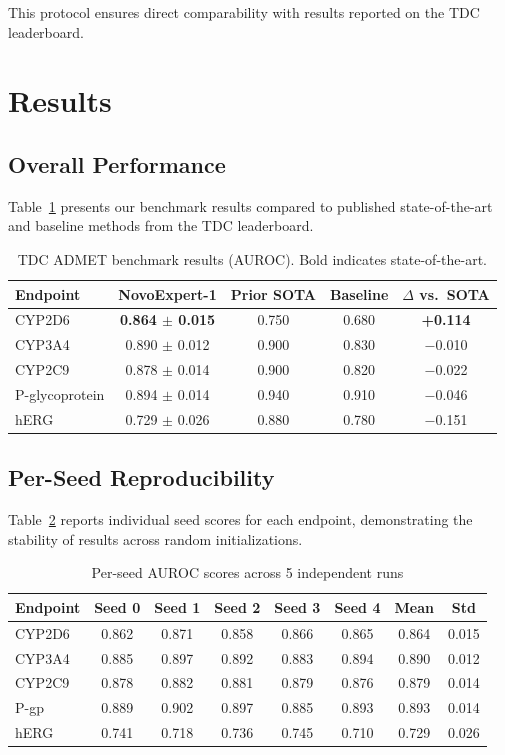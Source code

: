 \documentclass[11pt]{article}
\begin{document}
This protocol ensures direct comparability with results reported on the TDC leaderboard.

\section{Results}

\subsection{Overall Performance}

Table~\ref{tab:results} presents our benchmark results compared to published state-of-the-art and baseline methods from the TDC leaderboard.

\begin{table}[h]
\centering
\caption{TDC ADMET benchmark results (AUROC). Bold indicates state-of-the-art.}
\label{tab:results}
\begin{tabular}{lcccc}
\toprule
Endpoint & NovoExpert-1 & Prior SOTA & Baseline & $\Delta$ vs.\ SOTA \\
\midrule
CYP2D6 & \textbf{0.864 $\pm$ 0.015} & 0.750 & 0.680 & \textbf{+0.114} \\
CYP3A4 & 0.890 $\pm$ 0.012 & 0.900 & 0.830 & $-$0.010 \\
CYP2C9 & 0.878 $\pm$ 0.014 & 0.900 & 0.820 & $-$0.022 \\
P-glycoprotein & 0.894 $\pm$ 0.014 & 0.940 & 0.910 & $-$0.046 \\
hERG & 0.729 $\pm$ 0.026 & 0.880 & 0.780 & $-$0.151 \\
\bottomrule
\end{tabular}
\end{table}

\subsection{Per-Seed Reproducibility}

Table~\ref{tab:persseed} reports individual seed scores for each endpoint, demonstrating the stability of results across random initializations.

\begin{table}[h]
\centering
\caption{Per-seed AUROC scores across 5 independent runs}
\label{tab:persseed}
\begin{tabular}{lccccccc}
\toprule
Endpoint & Seed 0 & Seed 1 & Seed 2 & Seed 3 & Seed 4 & Mean & Std \\
\midrule
CYP2D6 & 0.862 & 0.871 & 0.858 & 0.866 & 0.865 & 0.864 & 0.015 \\
CYP3A4 & 0.885 & 0.897 & 0.892 & 0.883 & 0.894 & 0.890 & 0.012 \\
CYP2C9 & 0.878 & 0.882 & 0.881 & 0.879 & 0.876 & 0.879 & 0.014 \\
P-gp & 0.889 & 0.902 & 0.897 & 0.885 & 0.893 & 0.893 & 0.014 \\
hERG & 0.741 & 0.718 & 0.736 & 0.745 & 0.710 & 0.729 & 0.026 \\
\bottomrule
\end{tabular}
\end{table}
\end{document}

